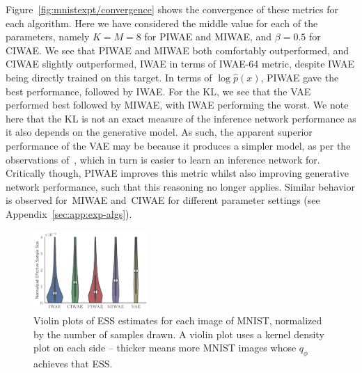 Figure~\ref{fig:mnistexpt/convergence} shows the convergence of these metrics
for each algorithm.  Here we have considered
the middle value for each of the parameters, namely $K=M=8$
for \gls{PIWAE} and \gls{MIWAE}, and $\beta=0.5$ for \gls{CIWAE}.  
We see that \gls{PIWAE} and \gls{MIWAE} both
comfortably outperformed, and \gls{CIWAE} slightly outperformed,
\gls{IWAE} in terms of \gls{IWAE}-64 metric, despite
\gls{IWAE} being directly trained on this target.  In terms of 
$\log \hat{p}(x)$, \gls{PIWAE} gave the best performance, 
followed by \gls{IWAE}.  For the \textsc{KL}, we see that
the \gls{VAE} performed best followed by \gls{MIWAE}, 
with \gls{IWAE} performing the worst.  
We note here that the \textsc{KL} is not an exact
measure of the inference network performance as it also depends on the generative model.
As such, the apparent superior performance of the \gls{VAE} may be because it produces a
simpler model, as per the observations of~\citet{Burda2016importance}, which in turn is easier
to learn an inference network for.  Critically though,
\gls{PIWAE} improves this metric whilst also improving generative network performance, such
that this reasoning no longer applies.  Similar behavior is observed for~\gls{MIWAE} and~\gls{CIWAE}
for different parameter settings (see Appendix~\ref{sec:app:exp-algs}).



\begin{figure}[t!]
	\centering
	\includegraphics[width=0.39\textwidth]{figures/tighter_bounds/ess_violin}\vspace{-10pt}
	\caption{Violin plots of ESS estimates for each image of MNIST,
		normalized by the number of samples drawn. A violin plot uses a kernel density plot on each side -- thicker means more MNIST images whose $q_{\phi}$ achieves that ESS. 
		\vspace{-17pt}  \label{fig:violiness}}
\end{figure}

